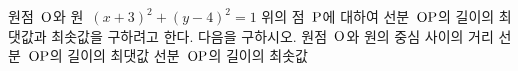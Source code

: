 원점~$\mathrm{O}$와 원~$(x+3)^2+(y-4)^2=1$ 위의 점~$\mathrm{P}$에 대하여 선분~$\mathrm{OP}$의 길이의 최댓값과 최솟값을 구하려고 한다. 다음을 구하시오.
 원점~$\mathrm{O}$와 원의 중심 사이의 거리
 선분~$\mathrm{OP}$의 길이의 최댓값
 선분~$\mathrm{OP}$의 길이의 최솟값
